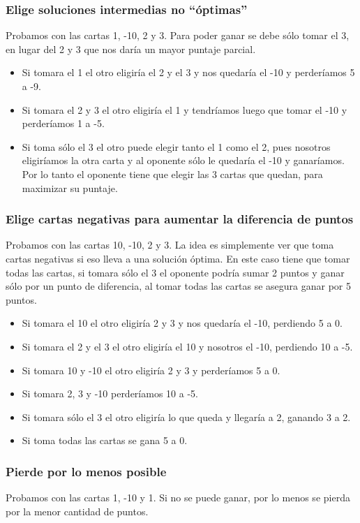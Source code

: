 \subsubsection{Elige soluciones intermedias no ``\'optimas''}
Probamos con las cartas 1, -10, 2 y 3. Para poder ganar se debe sólo tomar el 3, en lugar del 2 y 3 que nos daría un mayor puntaje parcial.

\begin{itemize}
   \item Si tomara el 1 el otro eligiría el 2 y el 3 y nos quedaría el -10 y perderíamos 5 a -9.
   \item Si tomara el 2 y 3 el otro eligiría el 1 y tendríamos luego que tomar el -10 y perderíamos 1 a -5.
   \item Si toma sólo el 3 el otro puede elegir tanto el 1 como el 2, pues nosotros eligiríamos la otra carta
      y al oponente sólo le quedaría el -10 y ganaríamos. Por lo tanto el oponente tiene que elegir las 3 cartas
      que quedan, para maximizar su puntaje.
\end{itemize}

\subsubsection{Elige cartas negativas para aumentar la diferencia de puntos}
Probamos con las cartas 10, -10, 2 y 3. La idea es simplemente ver que toma cartas negativas si
eso lleva a una solución óptima. En este caso tiene que tomar todas las cartas, si tomara sólo el 3 el oponente podría sumar
2 puntos y ganar sólo por un punto de diferencia, al tomar todas las cartas se asegura ganar por 5 puntos.

\begin{itemize}
   \item Si tomara el 10 el otro eligiría 2 y 3 y nos quedaría el -10, perdiendo 5 a 0.
   \item Si tomara el 2 y el 3 el otro eligiría el 10 y nosotros el -10, perdiendo 10 a -5.
   \item Si tomara 10 y -10 el otro eligiría 2 y 3 y perderíamos 5 a 0.
   \item Si tomara 2, 3 y -10 perderíamos 10 a -5.
   \item Si tomara sólo el 3 el otro eligiría lo que queda y llegaría a 2, ganando 3 a 2.
   \item Si toma todas las cartas se gana 5 a 0.
\end{itemize}

\subsubsection{Pierde por lo menos posible}
Probamos con las cartas 1, -10 y 1. Si no se puede ganar, por lo menos se pierda por la menor cantidad de puntos.


